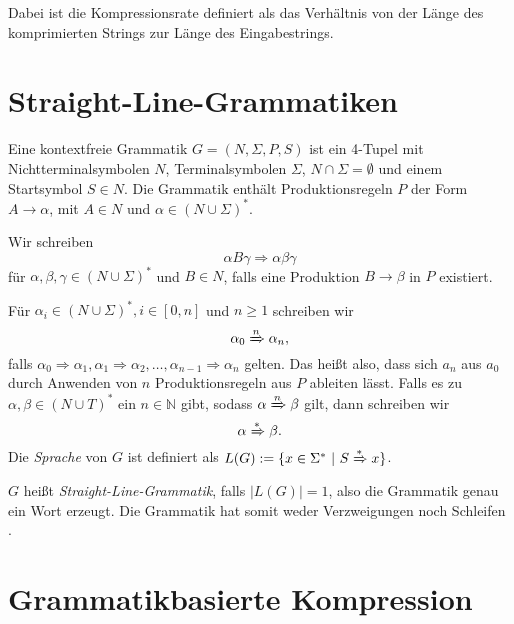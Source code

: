 Dabei ist die Kompressionsrate definiert als das Verhältnis von der Länge des komprimierten Strings zur Länge des Eingabestrings.

\section{Straight-Line-Grammatiken}

Eine kontextfreie Grammatik $G = (N, \Sigma, P, S)$ ist ein 4-Tupel mit Nichtterminalsymbolen $N$, Terminalsymbolen $\Sigma$, $N \cap \Sigma = \emptyset$ und einem Startsymbol $S \in N$.
Die Grammatik enthält Produktionsregeln $P$ der Form $A \rightarrow \alpha$, mit $A \in N$ und $\alpha \in (N \cup \Sigma)^*$.

Wir schreiben 
\begin{equation*}
	\alpha B \gamma \Rightarrow \alpha \beta \gamma
\end{equation*}
für $\alpha, \beta, \gamma \in (N \cup \Sigma)^*$ und $B \in N$, falls eine Produktion $B \rightarrow \beta$ in $P$ existiert. 

Für $\alpha_i \in (N \cup \Sigma)^*, i \in [0,n]$ und $n \geq 1$ schreiben wir 
\begin{equation*}
	\alpha_0 \xRightarrow{n} \alpha_n,
\end{equation*}
falls $\alpha_0 \Rightarrow \alpha_1, \alpha_1 \Rightarrow \alpha_2, \dots, \alpha_{n-1} \Rightarrow \alpha_n$ gelten. Das heißt also, dass sich $a_n$ aus $a_0$ durch Anwenden von $n$ Produktionsregeln aus $P$ ableiten lässt.
Falls es zu $\alpha, \beta \in (N \cup T)^*$ ein $n \in \mathbb{N}$ gibt, sodass $\alpha \xRightarrow{n} \beta$ gilt, dann schreiben wir 
\begin{equation*}
	\alpha \xRightarrow{*} \beta.
\end{equation*}
Die \emph{Sprache} von $G$ ist definiert als $L(G) := \{x \in \Sigma^*\ |\ S \xRightarrow{*} x\}$.

$G$ heißt \emph{Straight-Line-Grammatik}, falls $|L(G)| = 1$, also die Grammatik genau ein Wort erzeugt. Die Grammatik hat somit weder Verzweigungen noch Schleifen \cite{benz_effective_2013}. 

\section{Grammatikbasierte Kompression}
\label{grammarcomp}

